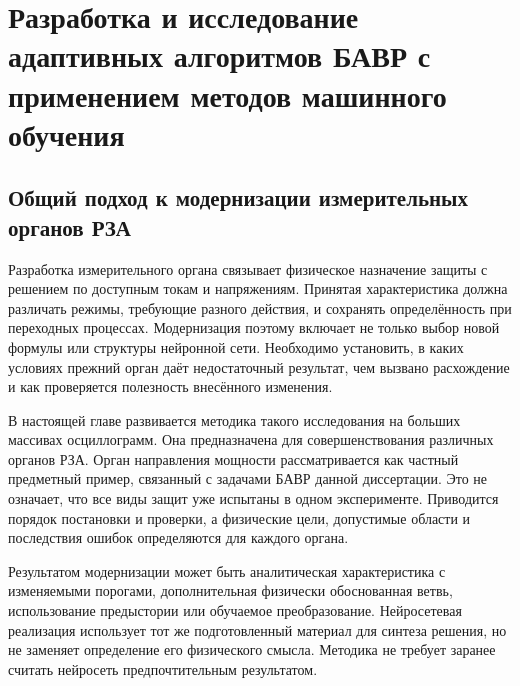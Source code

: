 
\chapter{Разработка и исследование адаптивных алгоритмов БАВР с применением методов машинного обучения}
\label{ch:ml_adaptive_algorithms}

\section{Общий подход к модернизации измерительных органов РЗА}
\label{sec:ch05_intro}

Разработка измерительного органа связывает физическое
назначение защиты с решением по доступным токам
и напряжениям. Принятая характеристика должна различать
режимы, требующие разного действия, и сохранять
определённость при переходных процессах.
Модернизация поэтому включает не только выбор
новой формулы или структуры нейронной сети.
Необходимо установить, в каких условиях прежний орган
даёт недостаточный результат, чем вызвано расхождение
и как проверяется полезность внесённого изменения.

В настоящей главе развивается методика такого исследования
на больших массивах осциллограмм.
Она предназначена для совершенствования различных
органов РЗА. Орган направления мощности
рассматривается как частный предметный пример,
связанный с задачами БАВР данной диссертации.
Это не означает, что все виды защит уже испытаны
в одном эксперименте. Приводится порядок постановки
и проверки, а физические цели, допустимые области
и последствия ошибок определяются для каждого органа.

Результатом модернизации может быть аналитическая
характеристика с изменяемыми порогами,
дополнительная физически обоснованная ветвь,
использование предыстории или обучаемое преобразование.
Нейросетевая реализация использует тот же подготовленный
материал для синтеза решения, но не заменяет
определение его физического смысла.
Методика не требует заранее считать нейросеть
предпочтительным результатом.

